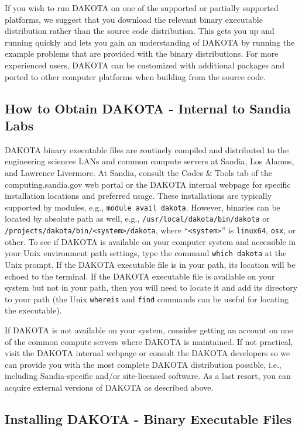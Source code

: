 If you wish to run DAKOTA on one of the supported or partially
supported platforms, we suggest that you download the relevant binary
executable distribution rather than the source code distribution. This
gets you up and running quickly and lets you gain an understanding of
DAKOTA by running the example problems that are provided with the
binary distributions.  For more experienced users, DAKOTA can be
customized with additional packages and ported to other computer
platforms when building from the source code.

\subsection{How to Obtain DAKOTA - Internal to Sandia Labs}\label{tutorial:installation:how2}

DAKOTA binary executable files are routinely compiled and distributed
to the engineering sciences LANs and common compute servers at Sandia,
Los Alamos, and Lawrence Livermore.  At Sandia, consult the
Codes \& Tools tab of the computing.sandia.gov web portal
or the DAKOTA internal webpage for specific installation
locations and preferred usage.  These installations are typically
supported by modules, e.g., \texttt{module avail dakota}.  However,
binaries can be located by absolute path as well, e.g.,
\texttt{/usr/local/dakota/bin/dakota} or
\texttt{/projects/dakota/bin/<system>/dakota}, where
``\texttt{<system>}'' is \texttt{linux64}, \texttt{osx}, or other.  To
see if DAKOTA is available on your computer system and accessible in
your Unix environment path settings, type the command \texttt{which
dakota} at the Unix prompt. If the DAKOTA executable file is in your
path, its location will be echoed to the terminal. If the DAKOTA
executable file is available on your system but not in your path, then
you will need to locate it and add its directory to your path (the
Unix \texttt{whereis} and \texttt{find} commands can be useful for
locating the executable).

If DAKOTA is not available on your system, consider getting an account
on one of the common compute servers where DAKOTA is maintained.  If
not practical, visit the DAKOTA internal webpage or consult the DAKOTA
developers so we can provide you with the most complete DAKOTA
distribution possible, i.e., including Sandia-specific and/or
site-licensed software.  As a last resort, you can acquire external
versions of DAKOTA as described above.

\subsection{Installing DAKOTA - Binary Executable Files}\label{tutorial:installation:installing1}

